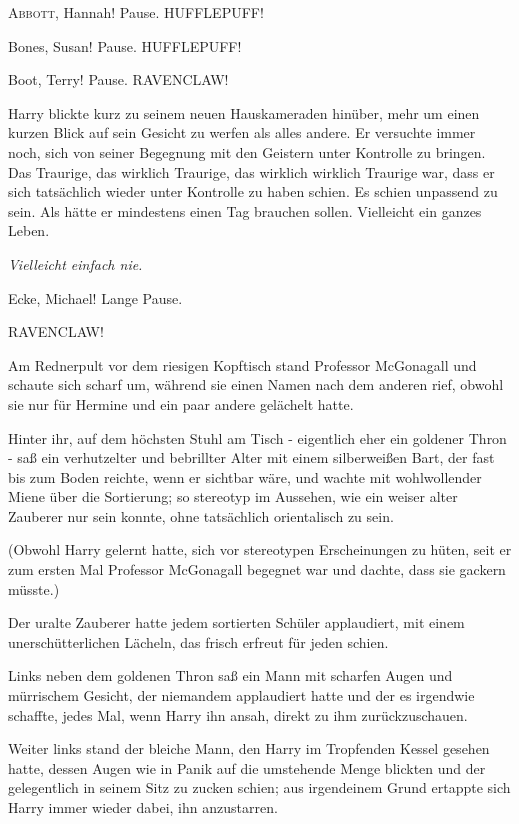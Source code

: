
\lettrine{\loq A}{bbott}, Hannah!\grqq{} Pause. \glqq HUFFLEPUFF!\grqq{}

\glqq Bones, Susan!\grqq{} Pause. \glqq HUFFLEPUFF!\grqq{}

\glqq Boot, Terry!\grqq{} Pause. \glqq RAVENCLAW!\grqq{}

Harry blickte kurz zu seinem neuen Hauskameraden hinüber, mehr um einen kurzen
Blick auf sein Gesicht zu werfen als alles andere. Er versuchte immer noch, sich
von seiner Begegnung mit den Geistern unter Kontrolle zu bringen. Das Traurige,
das wirklich Traurige, das wirklich wirklich Traurige war, dass er sich
tatsächlich wieder unter Kontrolle zu haben schien. Es schien unpassend zu sein.
Als hätte er mindestens einen Tag brauchen sollen. Vielleicht ein ganzes Leben.

\emph{Vielleicht einfach nie.}

\glqq Ecke, Michael!\grqq{} Lange Pause.

\glqq RAVENCLAW!\grqq{}

Am Rednerpult vor dem riesigen Kopftisch stand Professor McGonagall und schaute
sich scharf um, während sie einen Namen nach dem anderen rief, obwohl sie nur
für Hermine und ein paar andere gelächelt hatte.

Hinter ihr, auf dem höchsten Stuhl am Tisch - eigentlich eher ein goldener Thron
- saß ein verhutzelter und bebrillter Alter mit einem silberweißen Bart, der
fast bis zum Boden reichte, wenn er sichtbar wäre, und wachte mit wohlwollender
Miene über die Sortierung; so stereotyp im Aussehen, wie ein weiser alter
Zauberer nur sein konnte, ohne tatsächlich orientalisch zu sein.

(Obwohl Harry gelernt hatte, sich vor stereotypen Erscheinungen zu hüten, seit
er zum ersten Mal Professor McGonagall begegnet war und dachte, dass sie gackern
müsste.)

Der uralte Zauberer hatte jedem sortierten Schüler applaudiert, mit einem
unerschütterlichen Lächeln, das frisch erfreut für jeden schien.

Links neben dem goldenen Thron saß ein Mann mit scharfen Augen und mürrischem
Gesicht, der niemandem applaudiert hatte und der es irgendwie schaffte, jedes
Mal, wenn Harry ihn ansah, direkt zu ihm zurückzuschauen.

Weiter links stand der bleiche Mann, den Harry im Tropfenden Kessel gesehen
hatte, dessen Augen wie in Panik auf die umstehende Menge blickten und der
gelegentlich in seinem Sitz zu zucken schien; aus irgendeinem Grund ertappte
sich Harry immer wieder dabei, ihn anzustarren.

